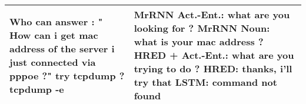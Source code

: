 \documentclass{article}
\begin{document}
\begin{table}[ht]
\begin{tabular}{p{65mm}|p{60mm}}
        Who can answer : " How can i get mac address of the server i just connected via pppoe ?"  try tcpdump ? tcpdump -e & \textbf{MrRNN Act.\@ -Ent.\@:} what are you looking for ? \newline \textbf{MrRNN Noun:} what is your mac address ? \newline \textbf{HRED + Act.\@-Ent.\@:} what are you trying to do ? \newline \textbf{HRED:} thanks, i'll try that \newline \textbf{LSTM:} command not found \\ \hline
 \end{tabular}
\end{table}
\end{document}
